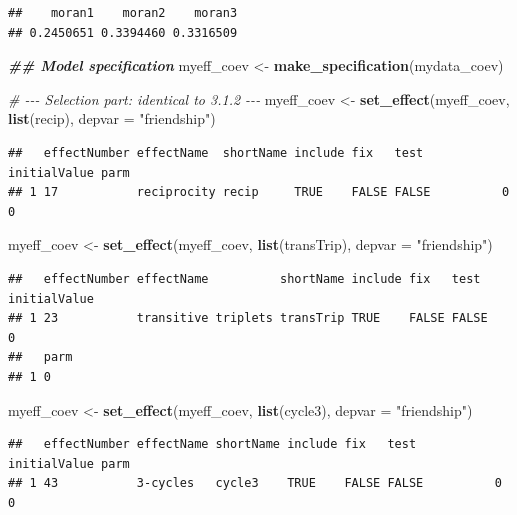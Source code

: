 \documentclass[
]{article}
\newenvironment{Shaded}{\begin{snugshade}}{\end{snugshade}}
\newcommand{\AttributeTok}[1]{\textcolor[rgb]{0.13,0.29,0.53}{#1}}
\newcommand{\CommentTok}[1]{\textcolor[rgb]{0.56,0.35,0.01}{\textit{#1}}}
\newcommand{\DocumentationTok}[1]{\textcolor[rgb]{0.56,0.35,0.01}{\textbf{\textit{#1}}}}
\newcommand{\FunctionTok}[1]{\textcolor[rgb]{0.13,0.29,0.53}{\textbf{#1}}}
\newcommand{\NormalTok}[1]{#1}
\newcommand{\OtherTok}[1]{\textcolor[rgb]{0.56,0.35,0.01}{#1}}
\newcommand{\StringTok}[1]{\textcolor[rgb]{0.31,0.60,0.02}{#1}}
\begin{document}
\begin{verbatim}
##    moran1    moran2    moran3 
## 0.2450651 0.3394460 0.3316509
\end{verbatim}

\begin{Shaded}
\begin{Highlighting}[]
\DocumentationTok{\#\# Model specification}
\NormalTok{myeff\_coev }\OtherTok{\textless{}{-}} \FunctionTok{make\_specification}\NormalTok{(mydata\_coev)}

\CommentTok{\# {-}{-}{-} Selection part: identical to 3.1.2 {-}{-}{-}}
\NormalTok{myeff\_coev }\OtherTok{\textless{}{-}} \FunctionTok{set\_effect}\NormalTok{(myeff\_coev, }\FunctionTok{list}\NormalTok{(recip),       }\AttributeTok{depvar =} \StringTok{"friendship"}\NormalTok{)}
\end{Highlighting}
\end{Shaded}

\begin{verbatim}
##   effectNumber effectName  shortName include fix   test  initialValue parm
## 1 17           reciprocity recip     TRUE    FALSE FALSE          0   0
\end{verbatim}

\begin{Shaded}
\begin{Highlighting}[]
\NormalTok{myeff\_coev }\OtherTok{\textless{}{-}} \FunctionTok{set\_effect}\NormalTok{(myeff\_coev, }\FunctionTok{list}\NormalTok{(transTrip),   }\AttributeTok{depvar =} \StringTok{"friendship"}\NormalTok{)}
\end{Highlighting}
\end{Shaded}

\begin{verbatim}
##   effectNumber effectName          shortName include fix   test  initialValue
## 1 23           transitive triplets transTrip TRUE    FALSE FALSE          0  
##   parm
## 1 0
\end{verbatim}

\begin{Shaded}
\begin{Highlighting}[]
\NormalTok{myeff\_coev }\OtherTok{\textless{}{-}} \FunctionTok{set\_effect}\NormalTok{(myeff\_coev, }\FunctionTok{list}\NormalTok{(cycle3),      }\AttributeTok{depvar =} \StringTok{"friendship"}\NormalTok{)}
\end{Highlighting}
\end{Shaded}

\begin{verbatim}
##   effectNumber effectName shortName include fix   test  initialValue parm
## 1 43           3-cycles   cycle3    TRUE    FALSE FALSE          0   0
\end{verbatim}
\end{document}
